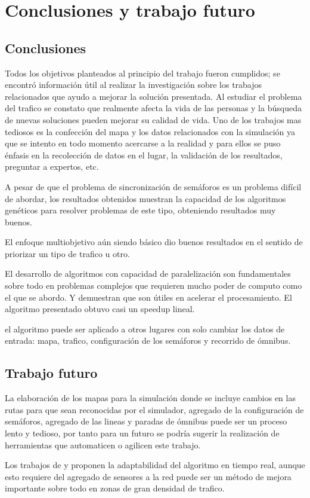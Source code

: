 \chapter{Conclusiones y trabajo futuro}

\section{Conclusiones}
Todos los objetivos planteados al principio del trabajo fueron cumplidos; se encontró información útil al realizar la investigación sobre los trabajos relacionados que ayudo a mejorar la solución presentada. 
Al estudiar el problema del trafico se constato que realmente afecta la vida de las personas y la búsqueda de nuevas soluciones pueden mejorar su calidad de vida.
Uno de los trabajos mas tediosos es la confección del mapa y los datos relacionados con la simulación ya que se intento en todo momento acercarse a la realidad y para ellos se puso énfasis en la recolección de datos en el lugar, la validación de los resultados, preguntar a expertos, etc.



 
A pesar de que el problema de sincronización de semáforos es un problema difícil de abordar, los resultados obtenidos
muestran la capacidad de los algoritmos genéticos para resolver problemas de este tipo, obteniendo resultados muy buenos. 

El enfoque multiobjetivo aún siendo básico dio buenos resultados en el sentido de priorizar un tipo de trafico u otro.

El desarrollo de algoritmos con capacidad de paralelización son fundamentales sobre  todo en problemas complejos que requieren mucho poder de computo como el que se abordo. Y demuestran que son útiles en acelerar el procesamiento. El algoritmo presentado obtuvo casi un speedup lineal.

el algoritmo puede ser aplicado a otros lugares con solo cambiar los datos de entrada: mapa, trafico, configuración de los semáforos y recorrido de ómnibus.


\section{Trabajo futuro}

La elaboración de los mapas para la simulación donde se incluye cambios en las rutas para que sean reconocidas por el simulador, agregado de la configuración de semáforos, agregado de las lineas y paradas de ómnibus puede ser un proceso lento y tedioso, por tanto para un futuro se podría sugerir la realización de herramientas que automaticen o agilicen este trabajo.

Los trabajos de  \citep{Montana1996} y \citep{Vogel2000}  proponen la adaptabilidad del algoritmo en tiempo real, aunque esto requiere del agregado de sensores a la red puede ser un método de mejora importante sobre todo en zonas de gran densidad de trafico.
